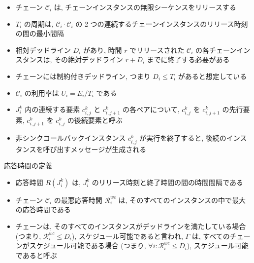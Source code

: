\begin{frame}{}
    \begin{itemize}
        \item チェーン $\mathcal{C}_{i}$ は, チェーンインスタンスの無限シーケンスをリリースする
        \item $T_{i}$ の周期は, $\mathcal{C}_{i} \cdot \mathcal{C}_{i}$ の 2 つの連続するチェーンインスタンスのリリース時刻の間の最小間隔
        \item 相対デッドライン $D_{i}$ があり, 時間 $r$ でリリースされた $\mathcal{C}_{i}$ の各チェーンインスタンスは, その絶対デッドライン $r+D_{i}$ までに終了する必要がある
        \item チェーンには制約付きデッドライン, つまり $D_{i} \leq T_{i}$ があると想定している
        \item $\mathcal{C}_{i}$ の利用率は $U_{i}=E_{i} / T_{i}$ である
    \end{itemize}
\end{frame}

\begin{frame}{}
    \begin{itemize}
        \item $J_{i}^{k}$ 内の連続する要素 $c_{i, j}^{k}$ と $c_{i, j+1}^{k}$ の各ペアについて, $c_{i, j}^{k}$ を $c_{i, j+1}^{k}$ の先行要素, $c_{i, j+1}^{k}$ を $c_{i, j}^{k}$ の後続要素と呼ぶ
        \item 非シンクコールバックインスタンス $c_{i, j}^{k}$ が実行を終了すると, 後続のインスタンスを呼び出すメッセージが生成される
    \end{itemize}
\end{frame}

\begin{frame}{応答時間の定義}
    \begin{itemize}
        \item 応答時間 $R\left(J_{i}^{k}\right)$ は,  $J_{i}^{k}$ のリリース時刻と終了時間の間の時間間隔である
        \item チェーン $\mathcal{C}_{i}$ の最悪応答時間 $\mathcal{R}_{i}^{w c}$ は, そのすべてのインスタンスの中で最大の応答時間である
        \item チェーンは, そのすべてのインスタンスがデッドラインを満たしている場合 (つまり, $\mathcal{R}_{i}^{w c} \leq D_{i}$), スケジュール可能であると言われ, $\Gamma$ は, すべてのチェーンがスケジュール可能である場合 (つまり, $\forall i: \mathcal{R}_{i}^{w c} \leq D_{i}$), スケジュール可能であると呼ぶ
    \end{itemize}
\end{frame}

